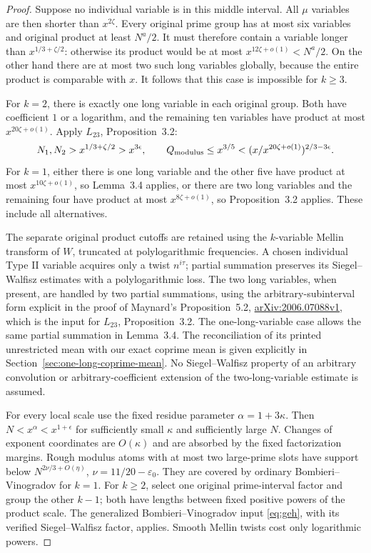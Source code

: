 \documentclass[11pt]{article}
\begin{document}
\begin{proof}
Suppose no individual variable is in this middle interval.
All $\mu$ variables are then shorter than $x^{2\zeta}$.
Every original prime group has at most six variables and
original product at least $N^a/2$. It must therefore contain
a variable longer than $x^{1/3+\zeta/2}$: otherwise its
product would be at most $x^{12\zeta+o(1)}<N^a/2$.
On the other hand there are at most two such long variables
globally, because the entire product is comparable with $x$.
It follows that this case is impossible for $k\ge3$.

For $k=2$, there is exactly one long variable in each original
group. Both have coefficient $1$ or a logarithm, and the
remaining ten variables have product at most $x^{20\zeta+o(1)}$.
Apply $L_{23}$, Proposition~3.2:
\[
 N_1,N_2>x^{1/3+\zeta/2}>x^{3\epsilon},
 \qquad
 Q_{\rm modulus}\le x^{3/5}
       <(x/x^{20\zeta+o(1)})^{2/3-3\epsilon}.
\]
For $k=1$, either there is one long variable and the other
five have product at most $x^{10\zeta+o(1)}$, so Lemma~3.4
applies, or there are two long variables and the remaining
four have product at most $x^{8\zeta+o(1)}$, so
Proposition~3.2 applies. These include all alternatives.

The separate original product cutoffs are retained using
the $k$-variable Mellin transform of $W$, truncated at
polylogarithmic frequencies. A chosen individual Type II
variable acquires only a twist $n^{i\tau}$; partial summation
preserves its Siegel--Walfisz estimates with a polylogarithmic
loss. The two long variables, when present, are handled by
two partial summations, using the arbitrary-subinterval form
explicit in the proof of Maynard's Proposition~5.2,
\href{https://arxiv.org/pdf/2006.07088v1}
{arXiv:2006.07088v1}, which is the input for $L_{23}$,
Proposition~3.2.
The one-long-variable case allows the same partial summation
in Lemma~3.4. The reconciliation of its printed unrestricted mean
with our exact coprime mean is given explicitly in
Section~\ref{sec:one-long-coprime-mean}.
No Siegel--Walfisz property of an arbitrary convolution or
arbitrary-coefficient extension of the two-long-variable
estimate is assumed.

For every local scale use the fixed residue parameter
$\alpha=1+3\kappa$. Then $N<x^\alpha<x^{1+\epsilon}$
for sufficiently small $\kappa$ and sufficiently large $N$.
Changes of exponent coordinates are $O(\kappa)$ and are
absorbed by the fixed factorization margins.
Rough modulus atoms with at most two large-prime slots have
support below $N^{2\nu/3+O(\eta)}$, $\nu=11/20-\varepsilon_0$.
They are covered by ordinary Bombieri--Vinogradov for $k=1$.
For $k\ge2$, select one original prime-interval factor and
group the other $k-1$; both have lengths between fixed
positive powers of the product scale. The generalized
Bombieri--Vinogradov input \eqref{eq:geh}, with its verified
Siegel--Walfisz factor, applies. Smooth Mellin twists cost
only logarithmic powers.


\end{proof}
\end{document}
